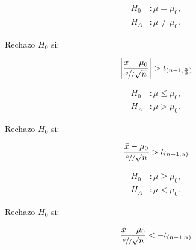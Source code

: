 

	\begin{minipage}[c]{\textwidth}
    \begin{minipage}[c]{0.3 \textwidth}\item
    	\begin{align*}
    	H_0&: \mu = \mu_0,\\
    	H_A&: \mu \neq \mu_0.    	
    	\end{align*}\end{minipage} \hfill
    \begin{minipage}[b]{0.3 \textwidth}\item
				Rechazo	$H_0$ si:		
		\end{minipage} \hfill
    \begin{minipage}[c]{0.3 \textwidth}\item
	 $$\left|\frac { \bar{x}-\mu_0  }{ \sfrac { s  }/{ \sqrt { n }  }  }\right| > t_{(n-1,\frac{\alpha}{2})}$$
    \end{minipage}
    \end{minipage}
    
    
	\begin{minipage}[c]{\textwidth}
    \begin{minipage}[c]{0.3 \textwidth}\item
    	\begin{align*}
    	H_0&: \mu \le \mu_0,\\
    	H_A&: \mu > \mu_0.    	
    	\end{align*}\end{minipage} \hfill
    \begin{minipage}[b]{0.3 \textwidth}\item
				Rechazo $H_0$ si:		
		\end{minipage} \hfill
    \begin{minipage}[c]{0.3 \textwidth}\item
	 $$\frac { \bar{x}-\mu_0  }{ \sfrac { s  }/{ \sqrt { n }  }  }> t_{(n-1,\alpha)}$$
    \end{minipage}
    \end{minipage}
    
		\begin{minipage}[b]{\textwidth}
    \begin{minipage}[c]{0.3 \textwidth}\item
    	\begin{align*}
    	H_0&: \mu \ge \mu_0,\\
    	H_A&: \mu < \mu_0.    	
    	\end{align*}\end{minipage} \hfill
    \begin{minipage}[c]{0.3 \textwidth}\item
				Rechazo $H_0$ si:		
		\end{minipage} \hfill
    \begin{minipage}[c]{0.3 \textwidth}\item
	 $$\frac { \bar{x}-\mu_0  }{ \sfrac {  s }/{ \sqrt { n }  }  }<- t_{(n-1,\alpha)}$$
    \end{minipage}
    \end{minipage}